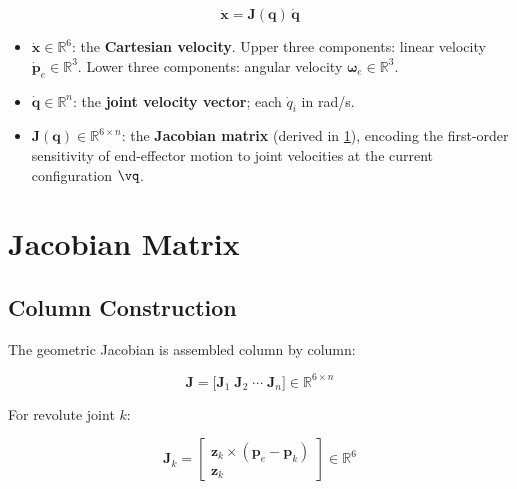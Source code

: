 \begin{equation}
\label{eq:diff_kin}
\dot{\mathbf{x}} = \mathbf{J}(\mathbf{q})\,\dot{\mathbf{q}}
\end{equation}

\begin{itemize}
  \item $\dot{\mathbf{x}}\in\mathbb{R}^6$: the \textbf{Cartesian
        velocity}.
        Upper three components: linear velocity
        $\dot{\mathbf{p}}_e\in\mathbb{R}^3$.
        Lower three components: angular velocity
        $\boldsymbol{\omega}_e\in\mathbb{R}^3$.
  \item $\dot{\mathbf{q}}\in\mathbb{R}^n$: the \textbf{joint velocity
        vector}; each $\dot{q}_i$ in rad/s.
  \item $\mathbf{J}(\mathbf{q})\in\mathbb{R}^{6\times n}$: the
        \textbf{Jacobian matrix} (derived in \cref{sec:jacobian}),
        encoding the first-order sensitivity of end-effector motion to
        joint velocities at the current configuration $\vq$.
\end{itemize}

\section{Jacobian Matrix}
\label{sec:jacobian}

\subsection{Column Construction}

The geometric Jacobian is assembled column by column:

\begin{equation}
\label{eq:jacobian_full}
\mathbf{J} =
\bigl[\mathbf{J}_1\;\mathbf{J}_2\;\cdots\;\mathbf{J}_n\bigr]
\in\mathbb{R}^{6\times n}
\end{equation}

For revolute joint $k$:

\begin{equation}
\label{eq:jacobian_col}
\mathbf{J}_k =
\begin{bmatrix}
\mathbf{z}_k\times(\mathbf{p}_e-\mathbf{p}_k) \\[4pt]
\mathbf{z}_k
\end{bmatrix}
\in\mathbb{R}^6
\end{equation}

